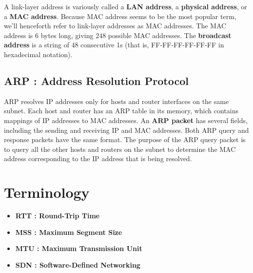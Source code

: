 \documentclass[11pt]{article}
\begin{document}
A link-layer address is variously called a \textbf{LAN address}, a \textbf{physical address}, or a \textbf{MAC address}. Because MAC address seems to be the most popular term, we’ll henceforth refer to link-layer addresses as MAC addresses. The MAC address is 6 bytes long, giving 248 possible MAC addresses. The \textbf{broadcast address} is a string of 48 consecutive 1s (that is, FF-FF-FF-FF-FF-FF in hexadecimal notation).

\subsection{ARP : Address Resolution Protocol}

ARP resolves IP addresses only for hosts and router interfaces on the same subnet. Each host and router has an ARP table in its memory, which contains mappings of IP addresses to MAC addresses. An \textbf{ARP packet} has several fields, including the sending and receiving IP and MAC addresses. Both ARP query and response packets have the same format. The purpose of the ARP query packet is to query all the other hosts and routers on the subnet to determine the MAC address corresponding to the IP address that is being resolved.


\newpage

\section{Terminology}

\begin{itemize}

	\item \textbf{RTT : Round-Trip Time}
	
	\item \textbf{MSS : Maximum Segment Size}
	
	\item \textbf{MTU : Maximum Transmission Unit}
	
	\item \textbf{SDN : Software-Defined Networking}

\end{itemize}
\end{document}
